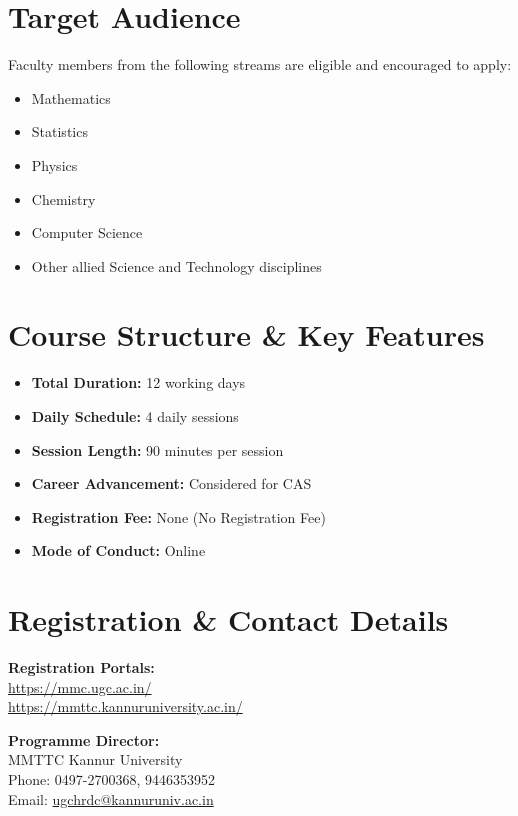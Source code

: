 \documentclass[11pt,a4paper]{article}
\begin{document}
\section*{Target Audience}
Faculty members from the following streams are eligible and encouraged to apply:
\begin{itemize}[label=\textcolor{secondary}{$\bullet$}, itemsep=0pt]
    \item Mathematics
    \item Statistics
    \item Physics
    \item Chemistry
    \item Computer Science
    \item Other allied Science and Technology disciplines
\end{itemize}

\section*{Course Structure \& Key Features}
\begin{itemize}[label=\textcolor{secondary}{$\bullet$}, itemsep=0pt]
    \item \textbf{Total Duration:} 12 working days
    \item \textbf{Daily Schedule:} 4 daily sessions
    \item \textbf{Session Length:} 90 minutes per session 
    \item \textbf{Career Advancement:} Considered for CAS
    \item \textbf{Registration Fee:} None (No Registration Fee)
    \item \textbf{Mode of Conduct:} Online
\end{itemize}

\section*{Registration \& Contact Details}

\begin{minipage}[t]{0.5\textwidth}
    \textbf{\color{accent} Registration Portals:}\\[0.3em]
    \url{https://mmc.ugc.ac.in/}\\
    \url{https://mmttc.kannuruniversity.ac.in/}
\end{minipage}
\begin{minipage}[t]{0.5\textwidth}
    \textbf{\color{accent} Programme Director:}\\[0.3em]
    MMTTC Kannur University\\
    Phone: 0497-2700368, 9446353952\\
    Email: \href{mailto:ugchrdc@kannuruniv.ac.in}{ugchrdc@kannuruniv.ac.in}
\end{minipage}
\end{document}
